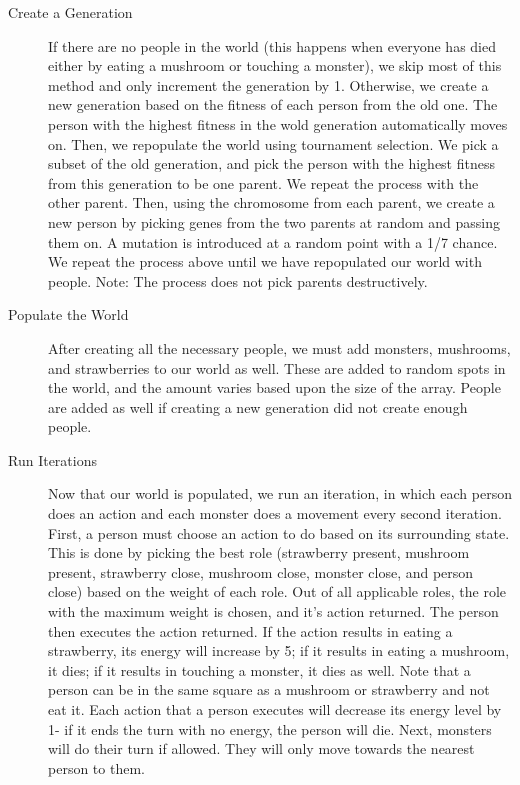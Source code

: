 \documentclass{article}
\begin{document}
\begin{description}
\item[Create a Generation]
If there are no people in the world (this happens when everyone has died either by eating a mushroom or touching a monster), we skip most of this method and only increment the generation by 1.  Otherwise, we create a new generation based on the fitness of each person from the old one.  The person with the highest fitness in the wold generation automatically moves on.  Then, we repopulate the world using tournament selection.  We pick a subset of the old generation, and pick the person with the highest fitness from this generation to be one parent.  We repeat the process with the other parent.  Then, using the chromosome from each parent, we create a new person by picking genes from the two parents at random and passing them on.  A mutation is introduced at a random point with a 1/7 chance.  We repeat the process above until we have repopulated our world with people. Note: The process does not pick parents destructively.
\item[Populate the World]
After creating all the necessary people, we must add monsters, mushrooms, and strawberries to our world as well.  These are added to random spots in the world, and the amount varies based upon the size of the array.  People are added as well if creating a new generation did not create enough people.
\item[Run Iterations]
Now that our world is populated, we run an iteration, in which each person does an action and each monster does a movement every second iteration.  First, a person must choose an action to do based on its surrounding state.  This is done by picking the best role (strawberry present, mushroom present, strawberry close, mushroom close, monster close, and person close) based on the weight of each role.  Out of all applicable roles, the role with the maximum weight is chosen, and it's action returned.  The person then executes the action returned.  If the action results in eating a strawberry, its energy will increase by 5; if it results in eating a mushroom, it dies; if it results in touching a monster, it dies as well.  Note that a person can be in the same square as a mushroom or strawberry and not eat it.  Each action that a person executes will decrease its energy level by 1- if it ends the turn with no energy, the person will die.  Next, monsters will do their turn if allowed.  They will only move towards the nearest person to them.
\end{description}
\end{document}
